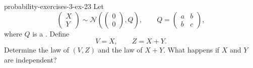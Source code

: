 \documentclass[preview]{standalone}
\begin{document}
\begin{snippetexercise}{probability-exercises-3-ex-23}{}
    Let
    \[
        \begin{pmatrix}
            X\\
            Y
        \end{pmatrix}
        \sim
        \mathcal N
        \left(
            \begin{pmatrix}
                0\\
                0
            \end{pmatrix},
            Q
        \right),
        \qquad
        Q=
        \begin{pmatrix}
            a & b\\
            b & c
        \end{pmatrix},
    \]
    where \(Q\) is a \positivedefinitematrix. Define
    \[
        V=X,
        \qquad
        Z=X+Y.
    \]
    Determine the law of \((V,Z)\) and the law of \(X+Y\). What happens if
    \(X\) and \(Y\) are independent?
\end{snippetexercise}
\end{document}
